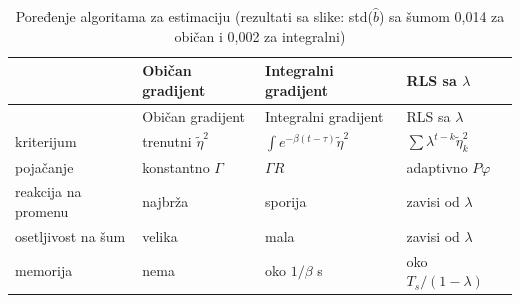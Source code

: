 \documentclass[11pt,a4paper,parskip=half,headsepline,numbers=noenddot]{scrartcl}
\begin{document}
\begin{longtable}[]{@{}
  >{\raggedright\arraybackslash}p{}
  >{\raggedright\arraybackslash}p{}
  >{\raggedright\arraybackslash}p{}
  >{\raggedright\arraybackslash}p{}@{}}
\caption{Poređenje algoritama za estimaciju (rezultati sa slike: std(\(\hat b\)) sa šumom 0,014 za običan i 0,002 za integralni)}\tabularnewline
\toprule\noalign{}
\begin{minipage}[b]{\linewidth}\raggedright
\end{minipage} & \begin{minipage}[b]{\linewidth}\raggedright
Običan gradijent
\end{minipage} & \begin{minipage}[b]{\linewidth}\raggedright
Integralni gradijent
\end{minipage} & \begin{minipage}[b]{\linewidth}\raggedright
RLS sa \(\lambda\)
\end{minipage} \\
\midrule\noalign{}
\endfirsthead
\toprule\noalign{}
\begin{minipage}[b]{\linewidth}\raggedright
\end{minipage} & \begin{minipage}[b]{\linewidth}\raggedright
Običan gradijent
\end{minipage} & \begin{minipage}[b]{\linewidth}\raggedright
Integralni gradijent
\end{minipage} & \begin{minipage}[b]{\linewidth}\raggedright
RLS sa \(\lambda\)
\end{minipage} \\
\midrule\noalign{}
\endhead
\bottomrule\noalign{}
\endlastfoot
kriterijum & trenutni \(\tilde\eta^2\) & \(\int e^{-\beta(t-\tau)}\tilde\eta^2\) & \(\sum\lambda^{t-k}\tilde\eta_k^2\) \\
pojačanje & konstantno \(\Gamma\) & \(\Gamma R\) & adaptivno \(P\varphi\) \\
reakcija na promenu & najbrža & sporija & zavisi od \(\lambda\) \\
osetljivost na šum & velika & mala & zavisi od \(\lambda\) \\
memorija & nema & oko \(1/\beta\) s & oko \(T_s/(1-\lambda)\) \\
\end{longtable}
\end{document}
